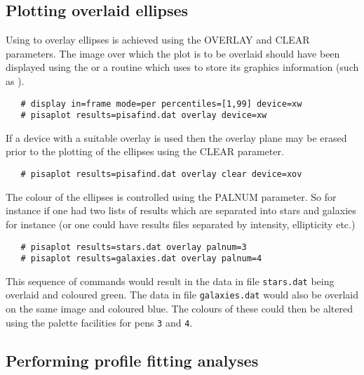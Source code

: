 \subsection{Plotting overlaid ellipses}
Using  to overlay ellipses is achieved using the OVERLAY and
CLEAR parameters. The image over which the plot is to be overlaid should
have been displayed using the  or a
routine which uses  to store its graphics information
(such as ).
\begin{verbatim}
   # display in=frame mode=per percentiles=[1,99] device=xw
   # pisaplot results=pisafind.dat overlay device=xw
\end{verbatim}

If a device with a suitable overlay is used then the overlay plane may
be erased prior to the plotting of the ellipses using the CLEAR
parameter.
\begin{verbatim}
   # pisaplot results=pisafind.dat overlay clear device=xov
\end{verbatim}

The colour of the ellipses is controlled using the PALNUM parameter. So
for instance if one had two lists of results which are separated into
stars and galaxies for instance (or one could have  results
files separated by intensity, ellipticity etc.)
\begin{verbatim}
   # pisaplot results=stars.dat overlay palnum=3
   # pisaplot results=galaxies.dat overlay palnum=4
\end{verbatim}
This sequence of commands would result in the data in file
\verb+stars.dat+ being overlaid and coloured green. The data in file
\verb+galaxies.dat+ would also be overlaid on the same image and
coloured blue. The colours of these could then be altered using the
 palette facilities for pens \verb+3+ and \verb+4+.

\subsection{Performing profile fitting analyses}

